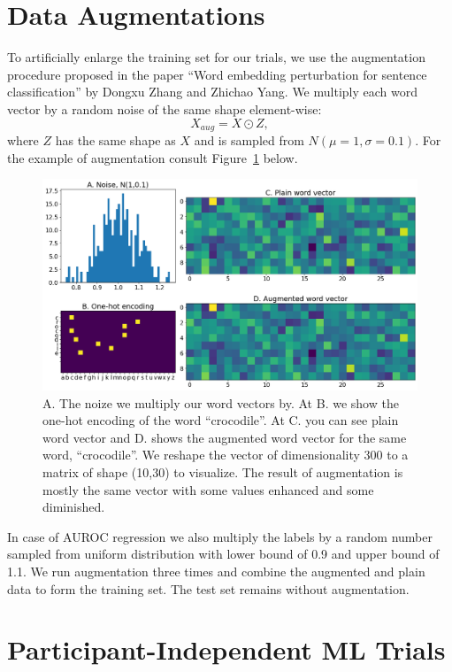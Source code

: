 \documentclass[12pt,letterpaper]{article}
\begin{document}
\begin{enumerate}
\newpage

\section{Data Augmentations}
To artificially enlarge the training set for our trials, we use the augmentation procedure proposed in the paper ``Word embedding perturbation for sentence classification'' by Dongxu Zhang and Zhichao Yang. We multiply each word vector by a random noise of the same shape element-wise:
\begin{equation}
    X_{aug} = X \odot Z,
\end{equation}
where \(Z\) has the same shape as \(X\) and is sampled from \(N(\mu=1, \sigma=0.1)\). For the example of augmentation consult Figure~\ref{fig:augmentation} below.

\begin{figure}[h!]
\includegraphics[width=\textwidth]{figures/Appendix2.png}
\caption{A. The noize we multiply our word vectors by. At B. we show the one-hot encoding of the word ``crocodile''. At C. you can see plain word vector and D. shows the augmented word vector for the same word, ``crocodile''. We reshape the vector of dimensionality 300 to a matrix of shape (10,30) to visualize. The result of augmentation is mostly the same vector with some values enhanced and some diminished. }
\label{fig:augmentation}
\end{figure}
In case of AUROC regression we also multiply the labels by a random number sampled from uniform distribution with lower bound of 0.9 and upper bound of 1.1. We run augmentation three times and combine the augmented and plain data to form the training set. The test set remains without augmentation.

\newpage

\section{Participant-Independent ML Trials}



\end{enumerate}
\end{document}
